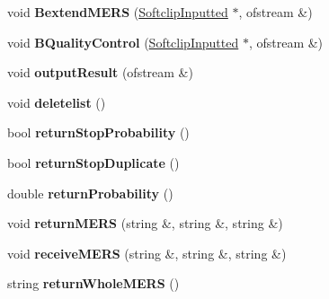 \begin{DoxyCompactItemize}
\item 
\hypertarget{classcalculation_a4362291b62beaa692783a5a6dccdf5a9}{void {\bfseries Bextend\+M\+E\+R\+S} (\hyperlink{struct_softclip_inputted}{Softclip\+Inputted} $\ast$, ofstream \&)}\label{classcalculation_a4362291b62beaa692783a5a6dccdf5a9}

\item 
\hypertarget{classcalculation_a842a434586559fd64ea5d4197162e1e1}{void {\bfseries B\+Quality\+Control} (\hyperlink{struct_softclip_inputted}{Softclip\+Inputted} $\ast$, ofstream \&)}\label{classcalculation_a842a434586559fd64ea5d4197162e1e1}

\item 
\hypertarget{classcalculation_a62103f7f566cbb30bad2001438b719e7}{void {\bfseries output\+Result} (ofstream \&)}\label{classcalculation_a62103f7f566cbb30bad2001438b719e7}

\item 
\hypertarget{classcalculation_ac89079e608df9907d1f928ab41e0c138}{void {\bfseries deletelist} ()}\label{classcalculation_ac89079e608df9907d1f928ab41e0c138}

\item 
\hypertarget{classcalculation_a987f22343e6da762cbf6c9f2a9de0226}{bool {\bfseries return\+Stop\+Probability} ()}\label{classcalculation_a987f22343e6da762cbf6c9f2a9de0226}

\item 
\hypertarget{classcalculation_a88398bb91531ebf806836b00ced1043e}{bool {\bfseries return\+Stop\+Duplicate} ()}\label{classcalculation_a88398bb91531ebf806836b00ced1043e}

\item 
\hypertarget{classcalculation_aabda75b8c0beb4c7074b235e16826f64}{double {\bfseries return\+Probability} ()}\label{classcalculation_aabda75b8c0beb4c7074b235e16826f64}

\item 
\hypertarget{classcalculation_aba87fb727a900944ce5db2e7c9969668}{void {\bfseries return\+M\+E\+R\+S} (string \&, string \&, string \&)}\label{classcalculation_aba87fb727a900944ce5db2e7c9969668}

\item 
\hypertarget{classcalculation_af228dd0eb3edf2fb6ed4db284ac16587}{void {\bfseries receive\+M\+E\+R\+S} (string \&, string \&, string \&)}\label{classcalculation_af228dd0eb3edf2fb6ed4db284ac16587}

\item 
\hypertarget{classcalculation_aac3fdbe1cc99c6ec18fc2fd55a1202df}{string {\bfseries return\+Whole\+M\+E\+R\+S} ()}\label{classcalculation_aac3fdbe1cc99c6ec18fc2fd55a1202df}

\end{DoxyCompactItemize}
